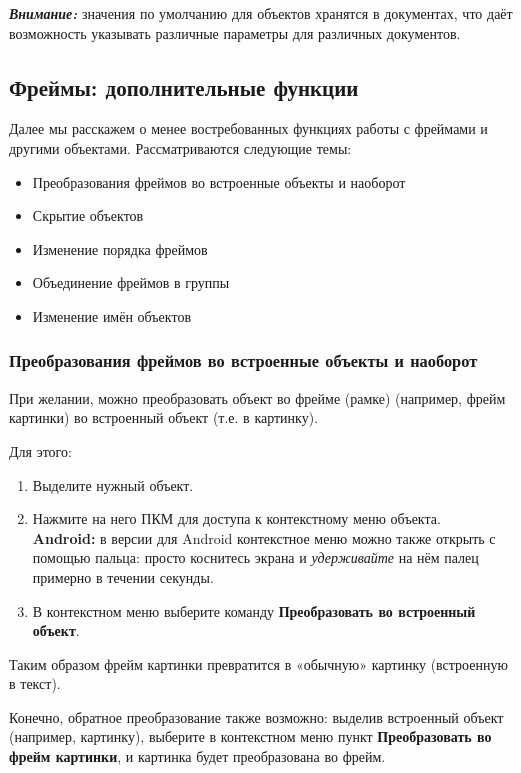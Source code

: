 ﻿\documentclass[a4paper,10pt]{article}
\begin{document}
\begin{mdframed}[backgroundcolor=blue!10]
\textbf{\textit{Внимание:}} значения по умолчанию для объектов хранятся в документах, что даёт возможность указывать различные параметры для различных документов.
\end{mdframed}

\subsection{Фреймы: дополнительные функции}
Далее мы расскажем о менее востребованных функциях работы с фреймами и другими объектами. Рассматриваются следующие темы:

\begin{itemize}
 \item Преобразования фреймов во встроенные объекты и наоборот
 \item Скрытие объектов
 \item Изменение порядка фреймов
 \item Объединение фреймов в группы
 \item Изменение имён объектов
\end{itemize}

\subsubsection{Преобразования фреймов во встроенные объекты и наоборот}
При желании, можно преобразовать объект во фрейме (рамке) (например, фрейм картинки) во встроенный объект (т.е. в картинку).

Для этого:

\begin{enumerate}
 \item Выделите нужный объект.
 \item Нажмите на него ПКМ для доступа к контекстному меню объекта.\\
 \textbf{Android:} в версии для Android контекстное меню можно также открыть с помощью пальца: просто коснитесь экрана и \textit{удерживайте} на нём палец примерно в течении секунды.
 \item В контекстном меню выберите команду \textbf{Преобразовать во встроенный объект}.
\end{enumerate}

Таким образом фрейм картинки превратится в «обычную» картинку (встроенную в текст).

Конечно, обратное преобразование также возможно: выделив встроенный объект (например, картинку), выберите в контекстном меню пункт \textbf{Преобразовать во фрейм картинки}, и картинка будет преобразована во фрейм.
\end{document}
